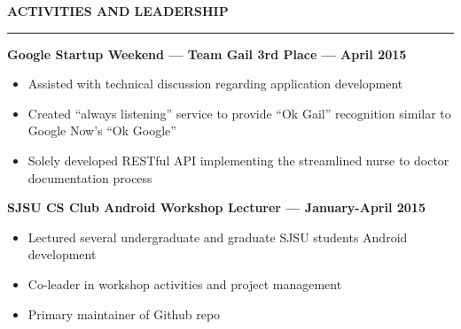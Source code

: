 \documentclass[10pt, oneside]{letter}
\newcommand{\linespaceshit} {
  \vspace{0.05in}
  \hrule
  \vspace{0.05in}
}
\begin{document}
  \textbf{ACTIVITIES AND LEADERSHIP}
  \linespaceshit
    \textbf{Google Startup Weekend --- Team Gail 3rd Place --- April 2015}
    \begin{adjustwidth}{0.2in}{0pt}
      \begin{itemize}
        \item Assisted with technical discussion regarding application development
        \item Created ``always listening'' service to provide ``Ok Gail'' recognition similar to Google Now's ``Ok Google''
        \item Solely developed RESTful API implementing the streamlined nurse to doctor documentation process
      \end{itemize}
    \end{adjustwidth}

    \textbf{SJSU CS Club Android Workshop Lecturer --- January-April 2015}
    \begin{adjustwidth}{0.2in}{0pt}
      \begin{itemize}
        \item Lectured several undergraduate and graduate SJSU students Android development
        \item Co-leader in workshop activities and project management
        \item Primary maintainer of Github repo
      \end{itemize}
    \end{adjustwidth}
\end{document}
